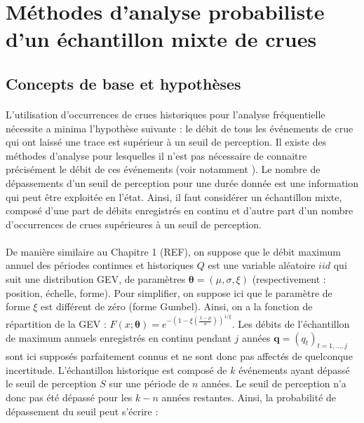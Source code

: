 \documentclass[11pt]{article}
\begin{document}
\section{Méthodes d'analyse probabiliste d'un échantillon mixte de crues}
	
	
	\subsection{Concepts de base et hypothèses}
	
	\paragraph{} 
	
		L'utilisation d'occurrences de crues historiques pour l'analyse fréquentielle nécessite a minima l'hypothèse suivante : le débit de tous les événements de crue qui ont laissé une trace est supérieur à un seuil de perception. Il existe des méthodes d'analyse pour lesquelles il n'est pas nécessaire de connaitre précisément le débit de ces événements (voir notamment \citet{stedinger_flood_1986}). Le nombre de dépassements d'un seuil de perception pour une durée donnée est une information qui peut être exploitée en l'état. Ainsi, il faut considérer un échantillon mixte, composé d'une part de débits enregistrés en continu et d'autre part d'un nombre d'occurrences de crues supérieures à un seuil de perception. 
			
		\paragraph{}
		De manière similaire au Chapitre 1 (REF), on suppose que le débit maximum annuel des périodes continues et historiques $Q$ est une variable aléatoire $iid$ qui suit une distribution GEV, de paramètres $\boldsymbol{\theta} = (\mu,\sigma,\xi)$ (respectivement : position, échelle, forme). Pour simplifier, on suppose ici que le paramètre de forme $\xi$ est différent de zéro (forme Gumbel). Ainsi, on a la fonction de répartition de la GEV : $F(x;\boldsymbol{\theta}) = e^{-(1-\xi(\frac{x - \mu}{\sigma}))^{1/\xi}}$. Les débits de l'échantillon de maximum annuels enregistrés en continu pendant $j$ années $\boldsymbol{q}= (q_t)_{t=1,...,j}$ sont ici supposés parfaitement connus et ne sont donc pas affectés de quelconque incertitude. L'échantillon historique est composé de $k$ événements ayant dépassé le seuil de perception $S$ sur une période de $n$ années. Le seuil de perception n'a donc pas été dépassé pour les $k-n$ années restantes. Ainsi, la probabilité de dépassement du seuil peut s'écrire :
		
\end{document}

